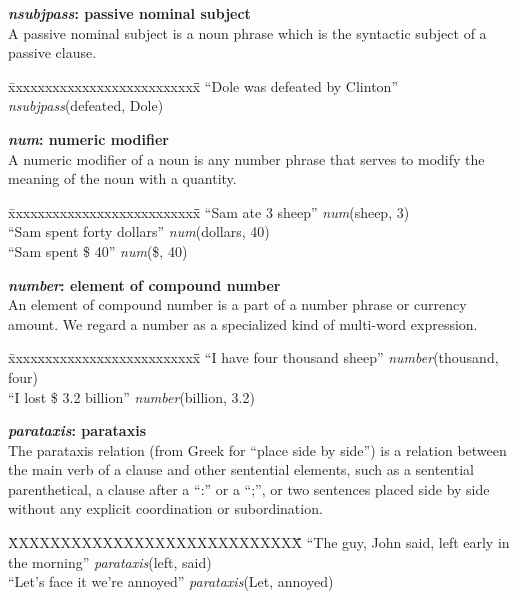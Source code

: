 \documentclass[11pt,letterpaper]{article}
\begin{document}
\noindent\textbf{\emph{nsubjpass}: passive nominal subject}\\
A passive nominal subject is a noun phrase which is the syntactic subject of a passive clause.
\begin{tabbing}
\hspace{1cm} \= xxxxxxxxxxxxxxxxxxxxxxxxxx\= \hspace{.5cm}\=  \kill
\> ``Dole was defeated by Clinton'' \> \> \emph{nsubjpass}(defeated, Dole)\\
\end{tabbing}

\noindent\textbf{\emph{num}: numeric modifier}\\
A numeric modifier of a noun is any number phrase that serves to
modify the meaning of the noun with a quantity.
\begin{tabbing}
\hspace{1cm} \= xxxxxxxxxxxxxxxxxxxxxxxxxx\= \hspace{.5cm}\=  \kill
\>  ``Sam ate 3 sheep'' \> \>  \emph{num}(sheep, 3)\\
\>  ``Sam spent forty dollars'' \> \>  \emph{num}(dollars, 40)\\
\>  ``Sam spent \$ 40'' \> \>  \emph{num}(\$, 40)\\
\end{tabbing}

\noindent\textbf{\emph{number}: element of compound number}\\
An element of compound number is a part of a number phrase or currency
amount. We regard a number as a specialized kind of multi-word expression.
\begin{tabbing}
\hspace{1cm} \= xxxxxxxxxxxxxxxxxxxxxxxxxx\= \hspace{.5cm}\=  \kill
\>  ``I have four thousand sheep'' \> \> \emph{number}(thousand, four)\\
\>  ``I lost \$ 3.2 billion'' \> \> \emph{number}(billion, 3.2)\\
\end{tabbing}

\noindent\textbf{\emph{parataxis}: parataxis}\\
The parataxis relation (from Greek for ``place side by side'') is a relation between the main verb of a clause and other sentential elements, such as a sentential parenthetical, a clause after a ``:'' or a ``;'', or two sentences placed side by side without any explicit coordination or subordination.
\begin{tabbing}
	\hspace{1cm} \=XXXXXXXXXXXXXXXXXXXXXXXXXXXX\= \hspace{2cm}\=  \kill
\> ``The guy, John said, left early in the morning'' \> \> \emph{parataxis}(left, said)\\
\> ``Let's face it we're annoyed'' \>\> \emph{parataxis}(Let, annoyed)\\
\end{tabbing}
\end{document}
